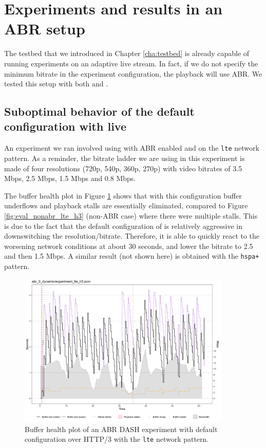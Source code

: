 \section{Experiments and results in an ABR setup}
\label{sec:eval/abr}

The testbed that we introduced in Chapter \ref{cha:testbed} is already capable of running experiments on an adaptive live stream. In fact, if we do not specify the minimum bitrate in the experiment configuration, the playback will use ABR. We tested this setup with both \dashjs{} and \hlsjs{}.

\subsection{Suboptimal behavior of the default \dashjs{} configuration with live}
\label{sec:eval/abr/dashjs}

An experiment we ran involved using \dashjs{} with ABR enabled and on the \texttt{lte} network pattern. As a reminder, the bitrate ladder we are using in this experiment is made of four resolutions (720p, 540p, 360p, 270p) with video bitrates of 3.5 Mbps, 2.5 Mbps, 1.5 Mbps and 0.8 Mbps.

The buffer health plot in Figure \ref{fig:eval_abr_dashjs} shows that with this configuration buffer underflows and playback stalls are essentially eliminated, compared to Figure \ref{fig:eval_nonabr_lte_h3} (non-ABR case) where there were multiple stalls. This is due to the fact that the default configuration of \dashjs{} is relatively aggressive in downswitching the resolution/bitrate. Therefore, it is able to quickly react to the worsening network conditions at about 30 seconds, and lower the bitrate to 2.5 and then 1.5 Mbps. A similar result (not shown here) is obtained with the \texttt{hspa+} pattern.

\begin{figure}[h]
    \centering
    \includegraphics[width=0.9\textwidth]{res/eval_abr_dash_dynamic.png}
    \caption{Buffer health plot of an ABR DASH experiment with default configuration over HTTP/3 with the \texttt{lte} network pattern.}
    \label{fig:eval_abr_dashjs}
\end{figure}

